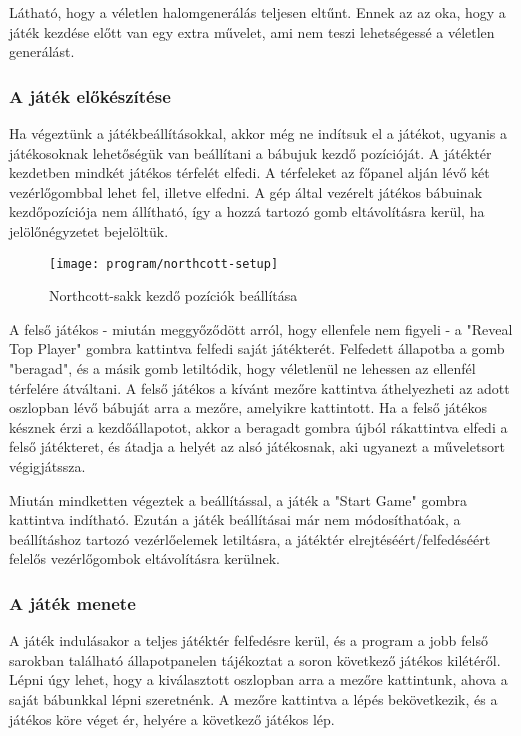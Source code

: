 Látható, hogy a véletlen halomgenerálás teljesen eltűnt. Ennek az az oka, hogy a játék kezdése előtt van egy extra művelet, ami nem teszi lehetségessé a véletlen generálást.

\subsubsection*{A játék előkészítése}
Ha végeztünk a játékbeállításokkal, akkor még ne indítsuk el a játékot, ugyanis a játékosoknak lehetőségük van beállítani a bábujuk kezdő pozícióját. A játéktér kezdetben mindkét játékos térfelét elfedi. A térfeleket az főpanel alján lévő két vezérlőgombbal lehet fel, illetve elfedni. A gép által vezérelt játékos bábuinak kezdőpozíciója nem állítható, így a hozzá tartozó gomb eltávolításra kerül, ha jelölőnégyzetet bejelöltük.\ujsor

\begin{figure}[ht]
	\texttt{[image: program/northcott-setup]}
	\centering
	\caption{Northcott-sakk kezdő pozíciók beállítása}
	\label{fig:northcott-setup}
\end{figure}

A felső játékos - miután meggyőződött arról, hogy ellenfele nem figyeli - a "Reveal Top Player" gombra kattintva felfedi saját játékterét. Felfedett állapotba a gomb "beragad", és a másik gomb letiltódik, hogy véletlenül ne lehessen az ellenfél térfelére átváltani. A felső játékos a kívánt mezőre kattintva áthelyezheti az adott oszlopban lévő bábuját arra a mezőre, amelyikre kattintott. Ha a felső játékos késznek érzi a kezdőállapotot, akkor a beragadt gombra újból rákattintva elfedi a felső játékteret, és átadja a helyét az alsó játékosnak, aki ugyanezt a műveletsort végigjátssza. \ujsor

Miután mindketten végeztek a beállítással, a játék a "Start Game" gombra kattintva indítható. Ezután a játék beállításai már nem módosíthatóak, a beállításhoz tartozó vezérlőelemek letiltásra, a játéktér elrejtéséért/felfedéséért felelős vezérlőgombok eltávolításra kerülnek.


\subsubsection*{A játék menete}
A játék indulásakor a teljes játéktér felfedésre kerül, és a program a jobb felső sarokban található állapotpanelen tájékoztat a soron következő játékos kilétéről. Lépni úgy lehet, hogy a kiválasztott oszlopban arra a mezőre kattintunk, ahova a saját bábunkkal lépni szeretnénk. A mezőre kattintva a lépés bekövetkezik, és a játékos köre véget ér, helyére a következő játékos lép.\ujsor

